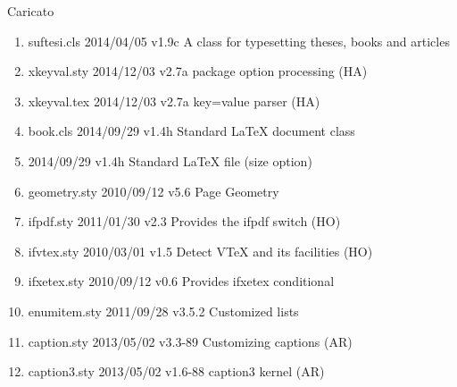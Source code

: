 Caricato
\begin{enumerate}
\item suftesi.cls 2014/04/05 v1.9c A class for typesetting theses, books and articles
\item xkeyval.sty 2014/12/03 v2.7a package option processing (HA)
\item xkeyval.tex 2014/12/03 v2.7a key=value parser (HA)
\item book.cls 2014/09/29 v1.4h Standard LaTeX document class
\item {} 2014/09/29 v1.4h Standard LaTeX file (size option)
\item geometry.sty 2010/09/12 v5.6 Page Geometry
\item ifpdf.sty 2011/01/30 v2.3 Provides the ifpdf switch (HO)
\item ifvtex.sty 2010/03/01 v1.5 Detect VTeX and its facilities (HO)
\item ifxetex.sty 2010/09/12 v0.6 Provides ifxetex conditional
\item enumitem.sty 2011/09/28 v3.5.2 Customized lists
\item caption.sty 2013/05/02 v3.3-89 Customizing captions (AR)
\item caption3.sty 2013/05/02 v1.6-88 caption3 kernel (AR)


\end{enumerate}
